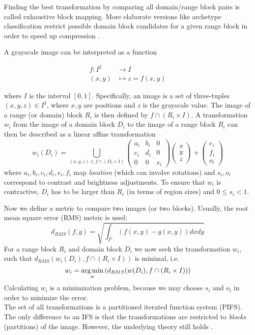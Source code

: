 Finding the best transformation by comparing all domain/range block pairs is
called exhaustive block mapping. More elaborate versions like archetype
classification restrict possible domain block candidates for a given range block
in order to speed up compression \cite{jacobs1992image}.

 A grayscale image can be interpreted as a function

\begin{align*}
    f \colon I^2 &\to I\\
    (x,y) &\mapsto z = f(x,y)
\end{align*}

where $I$ is the interval $[0,1]$. Specifically, an image is a set of three-tuples $(x,y,z) \in I^3$, where $x,y$ are positions and $z$ is the grayscale value.
The image of a range (or domain) block $R_i$ is then defined by $f \cap (R_i \times I)$.
A transformation $w_i$ from the image of a domain block $D_i$ to the image of a range block $R_i$ can then be described as a linear affine transformation
$$
w_i(D_i) = \bigcup_{(x,y,z) \in f \cap (D_i \times I)} \begin{pmatrix} a_i & b_i & 0 \\ c_i & d_i & 0 \\ 0 & 0 & s_i \end{pmatrix} \begin{pmatrix} x\\y\\z \end{pmatrix} + \begin{pmatrix} e_i\\f_i\\o_i \end{pmatrix}
$$
where $a_i, b_i, c_i, d_i, e_i, f_i$ map \textit{location} (which can involve rotations) and $s_i, o_i$ correspond to contrast and brightness adjustments.
To ensure that $w_i$ is contractive, $D_i$ has to be larger than $R_i$ (in terms of region sizes) and $0 \leq s_i < 1$.

Now we define a metric to compare two images (or two blocks). Usually, the root mean square error (RMS) metric is used:
$$
d_{RMS}(f,g) = \sqrt{\int_{I^2} (f(x,y)-g(x,y))dxdy}
$$
For a range block $R_i$ and domain block $D_i$ we now seek the transformation $w_i$, such that $d_{RMS}(w_i(D_i), f \cap (R_i \times I))$ is minimal, i.e.
\begin{equation} \label{eq:min-problem}
    w_i = \operatorname*{arg\,min}_{w} \left( d_{RMS}(w(D_i), f \cap (R_i \times I)) \right)
\end{equation}
Calculating $w_i$ is a minimization problem, because we may choose $s_i$ and $o_i$ in order to minimize the error.\\
The set of all transformations is a partitioned iterated function system (PIFS). The only difference to an IFS is that the transformations are restricted
to \textit{blocks} (partitions) of the image. However, the underlying theory still holds \cite{fisher2012}.

